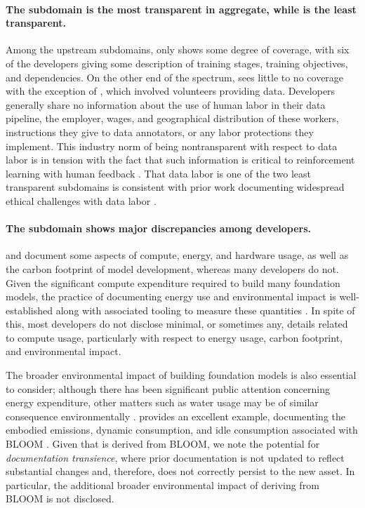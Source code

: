\documentclass[screen, authorversion, acmsmall]{acmart}
\begin{document}
\paragraph{The \methods subdomain is the most transparent in aggregate, while \labor is the least transparent.} 
Among the upstream subdomains, only \methods shows some degree of coverage, with six of the developers giving some description of training stages, training objectives, and dependencies.
On the other end of the spectrum, \labor sees little to no coverage with the exception of \bloomz, which involved volunteers providing data.
Developers generally share no information about the use of human labor in their data pipeline, the employer, wages, and geographical distribution of these workers, instructions they give to data annotators, or any labor protections they implement.
This industry norm of being nontransparent with respect to data labor is in tension with the fact that such information is critical to reinforcement learning with human feedback \citep{ziegler2019finetuning, ouyang2022instructions, casper2023open}.
That data labor is one of the two least transparent subdomains is consistent with prior work documenting widespread ethical challenges with data labor \citep{gray2019ghost, crawford2021atlas, hao2023cleaning}. 

\paragraph{The \compute subdomain shows major discrepancies among developers.} 
\meta and \stability document some aspects of compute, energy, and hardware usage, as well as the carbon footprint of model development, whereas many developers do not. 
Given the significant compute expenditure required to build many foundation models, the practice of documenting energy use and environmental impact is well-established along with associated tooling to measure these quantities \citep{lacoste2019quantifying,strubell2019energy,schwartz2020green,luccioni2023counting}. 
In spite of this, most developers do not disclose minimal, or sometimes any, details related to compute usage, particularly with respect to energy usage, carbon footprint, and environmental impact.

The broader environmental impact of building foundation models is also essential to consider; although there has been significant public attention concerning energy expenditure, other matters such as water usage may be of similar consequence environmentally \citep{luccioni2023counting}.
\citet{luccioni2022estimating} provides an excellent example, documenting the embodied emissions, dynamic consumption, and idle consumption associated with BLOOM \citep{scao2022bloom}.
Given that \bloomz is derived from BLOOM, we note the potential for \textit{documentation transience}, where prior documentation is not updated to reflect substantial changes and, therefore, does not correctly persist to the new asset. 
In particular, the additional broader environmental impact of deriving \bloomz from BLOOM is not disclosed.
\end{document}
